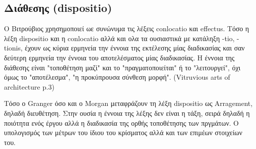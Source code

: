 





\subsection{Διάθεσης (dispositio)}
  
  
  
  
  
  
  Ο Βιτρούβιος χρησημοποιεί ωε συνώνυμα τις λέξεις conlocatio και effectus. 
  Τόσο η λέξη dispositio και η conlocatio αλλά και ολα τα ουσιαστικά με 
  κατάληξη -tio, -tionis, έχουν ως κύρια ερμηνεία την έννοια της εκτέλεσης μίας 
  διαδικασίας και σαν δεύτερη ερμηνεία την έννοια του αποτελέσματος μίας 
  διαδικασίας. Η έννοια της διάθεσης είναι "τοποθέτηση μαζί" και το 
  "πραγματοποιείται" ή το "λειτουργεί", όχι όμως το "αποτέλεσμα", "η 
  προκύπρουσα σύνθεση μορφή". (Vitruvious arts of architecture p.3)
  
  Τόσο ο Granger όσο και ο Morgan μεταφράζουν τη λέξη dispositio ως Arragement, δηλαδή διευθέτηση. Στην ουσία η έννοια της λέξης δεν είναι η τάξη, σειρά δηλαδή η ποιότητα ενός έργου αλλά η διαδικασία της ορθής τοποθέτησης των πργμάτων. Ο υπολογισμός των μέτρων του ίδιου του κρίσματος αλλά και των επιμέων στοιχείων του.






